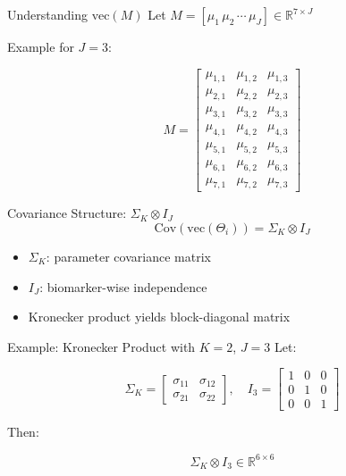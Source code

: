 \documentclass[
  ignorenonframetext,
]{beamer}
\providecommand{\tightlist}{%
  \setlength{\itemsep}{0pt}\setlength{\parskip}{0pt}}\usepackage{longtable,booktabs,array}
\begin{document}
\begin{frame}{Understanding \(\text{vec}(M)\)}
\label{understanding-textvecm}
Let \(M = [\mu_1\, \mu_2\, \cdots\, \mu_J] \in \mathbb{R}^{7 \times J}\)

Example for \(J=3\):

\[
M =
\begin{bmatrix}
\mu_{1,1} & \mu_{1,2} & \mu_{1,3} \\
\mu_{2,1} & \mu_{2,2} & \mu_{2,3} \\
\mu_{3,1} & \mu_{3,2} & \mu_{3,3} \\
\mu_{4,1} & \mu_{4,2} & \mu_{4,3} \\
\mu_{5,1} & \mu_{5,2} & \mu_{5,3} \\
\mu_{6,1} & \mu_{6,2} & \mu_{6,3} \\
\mu_{7,1} & \mu_{7,2} & \mu_{7,3}
\end{bmatrix}
\]
\end{frame}

\begin{frame}{Covariance Structure: \(\Sigma_K \otimes I_J\)}
\label{covariance-structure-sigma_k-otimes-i_j}
\[
\text{Cov}(\text{vec}(\Theta_i)) = \Sigma_K \otimes I_J
\]

\begin{itemize}
\tightlist
\item
  \(\Sigma_K\): parameter covariance matrix
\item
  \(I_J\): biomarker-wise independence
\item
  Kronecker product yields block-diagonal matrix
\end{itemize}
\end{frame}

\begin{frame}{Example: Kronecker Product with \(K=2\), \(J=3\)}
\label{example-kronecker-product-with-k2-j3}
Let:

\[
\Sigma_K =
\begin{bmatrix}
\sigma_{11} & \sigma_{12} \\
\sigma_{21} & \sigma_{22}
\end{bmatrix},\quad
I_3 =
\begin{bmatrix}
1 & 0 & 0 \\
0 & 1 & 0 \\
0 & 0 & 1
\end{bmatrix}
\]

Then:

\[
\Sigma_K \otimes I_3 \in \mathbb{R}^{6 \times 6}
\]
\end{frame}
\end{document}
